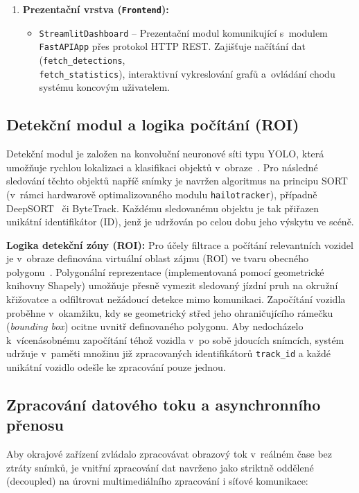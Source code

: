 \begin{enumerate}
    \item \textbf{Prezentační vrstva (\texttt{Frontend}):}
    \begin{itemize}
        \item \texttt{StreamlitDashboard} – Prezentační modul komunikující s~modulem \texttt{FastAPIApp} přes protokol HTTP REST. Zajišťuje načítání dat (\texttt{fetch\_detections}, \\ \texttt{fetch\_statistics}), interaktivní vykreslování grafů a~ovládání chodu systému koncovým uživatelem.
    \end{itemize}
\end{enumerate}

\subsection{Detekční modul a logika počítání (ROI)}
Detekční modul je založen na konvoluční neuronové síti typu \acs{YOLO}, která umožňuje rychlou lokalizaci a klasifikaci objektů v~obraze~\cite{redmon_yolo_2016}. Pro následné sledování těchto objektů napříč snímky je navržen algoritmus na principu \acs{SORT}~\cite{SORT_original_2016} (v~rámci hardwarově optimalizovaného modulu \texttt{hailotracker}), případně \acs{DeepSORT}~\cite{wojke_deepsort_2017} či ByteTrack. Každému sledovanému objektu je tak přiřazen unikátní identifikátor (\acs{ID}), jenž je udržován po celou dobu jeho výskytu ve scéně.

\textbf{Logika detekční zóny (ROI):}
Pro účely filtrace a počítání relevantních vozidel je v~obraze definována virtuální oblast zájmu (\acs{ROI}) ve tvaru obecného polygonu~\cite{mdpi_roi_tracking_2022}. Polygonální reprezentace (implementovaná pomocí geometrické knihovny Shapely) umožňuje přesně vymezit sledovaný jízdní pruh na okružní křižovatce a odfiltrovat nežádoucí detekce mimo komunikaci. Započítání vozidla proběhne v~okamžiku, kdy se geometrický střed jeho ohraničujícího rámečku (\textit{bounding box}) ocitne uvnitř definovaného polygonu. Aby nedocházelo k~vícenásobnému započítání téhož vozidla v~po sobě jdoucích snímcích, systém udržuje v~paměti množinu již zpracovaných identifikátorů \texttt{track\_id} a každé unikátní vozidlo odešle ke zpracování pouze jednou.


\subsection{Zpracování datového toku a asynchronního přenosu}
Aby okrajové zařízení zvládalo zpracovávat obrazový tok v~reálném čase bez ztráty snímků, je vnitřní zpracování dat navrženo jako striktně oddělené (decoupled) na úrovni multimediálního zpracování i síťové komunikace:

